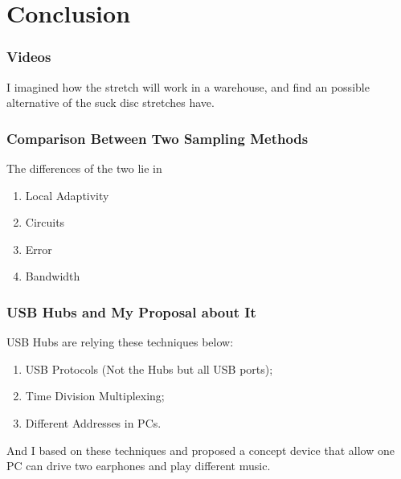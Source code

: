 \documentclass{article}
\begin{document}
\section{Conclusion}
\subsubsection*{Videos}
I imagined how the stretch will work in a warehouse, and find an possible alternative of the suck disc stretches have.
\subsubsection*{Comparison Between Two Sampling Methods}
The differences of the two lie in
\begin{enumerate}
	\item Local Adaptivity
	\item Circuits
	\item Error
	\item Bandwidth
\end{enumerate}
\subsubsection*{USB Hubs and My Proposal about It}
USB Hubs are relying these techniques below:
\begin{enumerate}
	\item USB Protocols (Not the Hubs but all USB ports);
	\item Time Division Multiplexing;
	\item Different Addresses in PCs.
\end{enumerate}

And I based on these techniques and proposed a concept device that allow one PC can drive two earphones and play different music.




\end{document}
